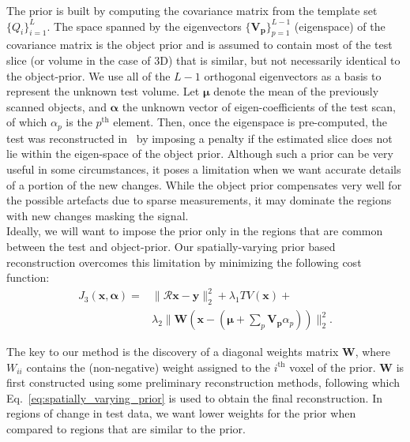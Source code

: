 \documentclass[journal]{IEEEtran}
\begin{document}
The prior is built by computing the covariance matrix from the
template set $\{Q_i\}_{i=1}^L$. The space spanned by the eigenvectors
$\{\boldsymbol{V_p}\}_{p=1}^{L-1}$ (eigenspace) of the covariance
matrix is the object prior and is assumed to contain most of the test
slice (or volume in the case of 3D) that is similar, but not
necessarily identical to the object-prior. We use all of the $L-1$
orthogonal eigenvectors as a basis to represent the unknown test
volume. Let $\boldsymbol{\mu}$ denote the mean of the previously
scanned objects, and $\boldsymbol{\alpha}$ the unknown vector of
eigen-coefficients of the test scan, of which $\alpha_p$ is the
$p^{\textrm{th}}$ element. Then, once the eigenspace is pre-computed,
the test was reconstructed in~\cite{my_dicta_paper} by imposing a
penalty if the estimated slice does not lie within the eigen-space of
the object prior. Although such a prior can be very useful in some circumstances, it poses a limitation when we want accurate details of a portion of
the new changes. While the object prior compensates very well for the
possible artefacts due to sparse measurements, it may dominate the
regions with new changes masking the signal. \\

Ideally, we will want to
impose the prior only in the regions that are common between the test
and object-prior.  Our spatially-varying prior based reconstruction
overcomes this limitation by minimizing the following cost function:
\begin{equation}
  \begin{split}
  J_3(\boldsymbol{x},\boldsymbol{\alpha}) = &\lVert\boldsymbol{\mathcal{R} x}-\boldsymbol{y}\rVert_2^2  + \lambda_1TV(\boldsymbol{x}) +\\
  &\lambda_2\lVert\boldsymbol{W}(\boldsymbol{x} - (\boldsymbol{\mu} + \sum_{p}\boldsymbol{V_p}\alpha_p))\rVert_2^2.
  \label{eq:spatially_varying_prior}
  \end{split}
\end{equation}


The key to our method is the discovery of a diagonal weights matrix
$\boldsymbol{W}$, where $W_{ii}$ contains the (non-negative) weight
assigned to the $i^{\textrm{th}}$ voxel of the prior. $\boldsymbol{W}$
is first constructed using some preliminary reconstruction methods,
following which Eq.~\ref{eq:spatially_varying_prior} is used to obtain
the final reconstruction. In regions of change in test data, we want
lower weights for the prior when compared to regions that are similar
to the prior.
\end{document}
